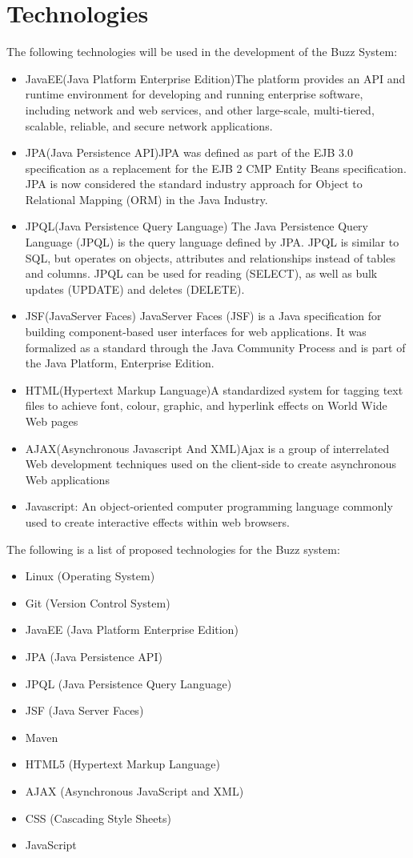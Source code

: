 \documentclass[a4paper]{article}
\begin{document}
\section{Technologies}
The following technologies will be used in the development of the Buzz System:
\begin{itemize}
\item JavaEE(Java Platform Enterprise Edition)The platform provides an API and runtime environment for developing and running enterprise software, including network and web services, and other large-scale, multi-tiered, scalable, reliable, and secure network applications.
\item JPA(Java Persistence API)JPA was defined as part of the EJB 3.0 specification as a replacement for the EJB 2 CMP Entity Beans specification. JPA is now considered the standard industry approach for Object to Relational Mapping (ORM) in the Java Industry. 
\item JPQL(Java Persistence Query Language) The Java Persistence Query Language (JPQL) is the query language defined by JPA. JPQL is similar to SQL, but operates on objects, attributes and relationships instead of tables and columns. JPQL can be used for reading (SELECT), as well as bulk updates (UPDATE) and deletes (DELETE).
\item JSF(JavaServer Faces) JavaServer Faces (JSF) is a Java specification for building component-based user interfaces for web applications. It was formalized as a standard through the Java Community Process and is part of the Java Platform, Enterprise Edition.
\item HTML(Hypertext Markup Language)A standardized system for tagging text files to achieve font, colour, graphic, and hyperlink effects on World Wide Web pages
\item AJAX(Asynchronous Javascript And XML)Ajax is a group of interrelated Web development techniques used on the client-side to create asynchronous Web applications
\item Javascript: An object-oriented computer programming language commonly used to create interactive effects within web browsers.
\end{itemize}

The following is a list of proposed technologies for the Buzz system:

\begin{itemize}
\item Linux (Operating System)
\item Git (Version Control System)
\item JavaEE (Java Platform Enterprise Edition)
\item JPA (Java Persistence API)
\item JPQL (Java Persistence Query Language)
\item JSF (Java Server Faces)
\item Maven
\item HTML5 (Hypertext Markup Language)
\item AJAX (Asynchronous JavaScript and XML)
\item CSS (Cascading Style Sheets)
\item JavaScript
\end{itemize}
\end{document}
